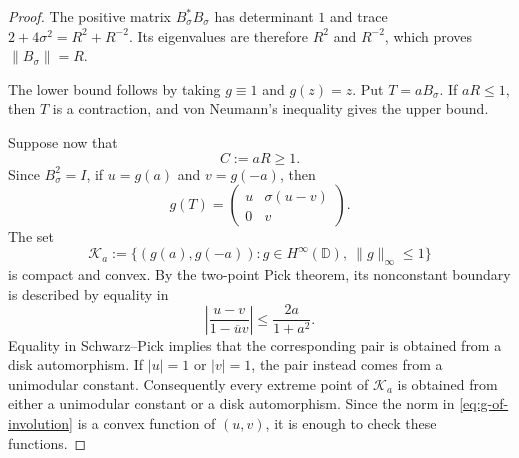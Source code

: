 \documentclass[11pt]{article}
\theoremstyle{remark}
\begin{document}
\begin{proof}
The positive matrix \(B_\sigma^*B_\sigma\) has determinant \(1\) and
trace \(2+4\sigma^2=R^2+R^{-2}\).  Its eigenvalues are therefore
\(R^2\) and \(R^{-2}\), which proves \(\|B_\sigma\|=R\).

The lower bound follows by taking \(g\equiv 1\) and \(g(z)=z\).
Put \(T=aB_\sigma\).  If \(aR\leq 1\), then \(T\) is a contraction,
and von Neumann's inequality gives the upper bound.

Suppose now that
\[
  C:=aR\geq 1.
\]
Since \(B_\sigma^2=I\), if \(u=g(a)\) and \(v=g(-a)\), then
\begin{equation}
\label{eq:g-of-involution}
  g(T)=
  \begin{pmatrix}
    u&\sigma(u-v)\\
    0&v
  \end{pmatrix}.
\end{equation}
The set
\[
  \mathcal K_a
  :=\{(g(a),g(-a)):g\in H^\infty(\mathbb D),\ \|g\|_\infty\leq 1\}
\]
is compact and convex.  By the two-point Pick theorem, its nonconstant
boundary is described by equality in
\[
  \left|\frac{u-v}{1-\overline{u}v}\right|
  \leq \frac{2a}{1+a^2}.
\]
Equality in Schwarz--Pick implies that the corresponding pair is
obtained from a disk automorphism.  If \(|u|=1\) or \(|v|=1\), the
pair instead comes from a unimodular constant.  Consequently every
extreme point of \(\mathcal K_a\) is obtained from either a unimodular
constant or a disk automorphism.  Since the norm in
\eqref{eq:g-of-involution} is a convex function of \((u,v)\), it is
enough to check these functions.


\end{proof}
\end{document}
